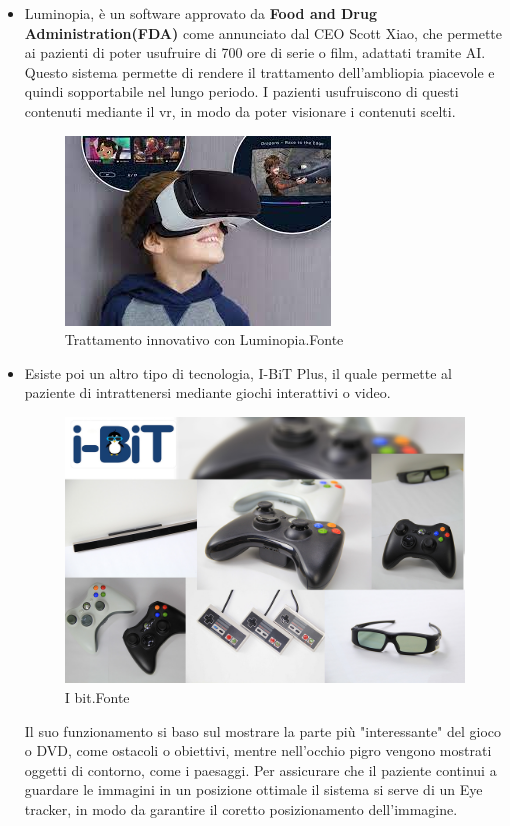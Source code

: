 \documentclass[10pt,a4paper]{article}
\begin{document}
\begin{itemize}
		\item Luminopia, è un software approvato da  \textbf{Food and Drug Administration(FDA)} come annunciato dal CEO Scott Xiao, che permette ai pazienti di poter usufruire di 700 ore di serie o film, adattati tramite AI. Questo sistema permette di rendere il trattamento dell'ambliopia piacevole e quindi sopportabile nel lungo periodo.
		I pazienti usufruiscono di questi contenuti mediante il vr, in modo da poter visionare i contenuti scelti.
			\begin{figure}[h]
				\centering
				\includegraphics[width=0.7\linewidth]{image/luminopia}
				\caption{Trattamento innovativo con Luminopia.Fonte\cite{Lumiopia_image}}
				\label{fig:luminopia}
			\end{figure}
	    \item Esiste poi un altro tipo di tecnologia, I-BiT Plus\cite{I-Bit}, il quale permette al paziente di intrattenersi mediante giochi interattivi o video.
	    \begin{figure}[h]
	    	\centering
	    	\includegraphics[width=0.7\linewidth]{image/I_bit}
	    	\caption{I bit.Fonte\cite{I-Bit}}
	    	\label{fig:I_bit}
	    \end{figure}
	    Il suo funzionamento si baso sul mostrare la parte più "interessante" del gioco o DVD, come ostacoli o obiettivi, mentre nell'occhio pigro vengono mostrati oggetti di contorno, come i paesaggi.
	    Per assicurare che il paziente continui a guardare le immagini in un posizione ottimale il sistema si serve di un Eye tracker, in modo da garantire il coretto posizionamento dell'immagine.
	    
    \end{itemize}
\newpage
\null
\newpage
\end{document}
